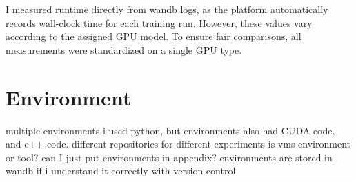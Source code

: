 I measured runtime directly from \acrshort{wandb} logs, as the platform automatically records wall-clock time for each training run. However, these values vary according to the assigned GPU model. To ensure fair comparisons, all measurements were standardized on a single GPU type. 

\section{Environment} 

multiple environments
i used python, but environments also had CUDA code, and c++ code. 
different repositories for different experiments
is vms environment or tool?
can I just put environments in appendix? environments are stored in wandb if i understand it correctly with version control